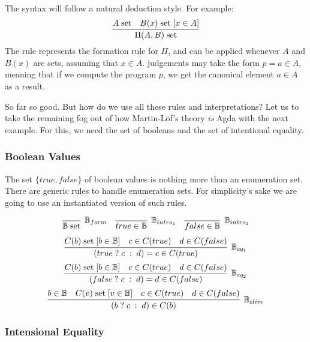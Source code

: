 \newcommand{\isset}[1]{#1 \; \text{set}}
\newcommand{\withhip}[2]{#2 \; [ #1 ] }
\newcommand{\BB}{\mathbb{B}}
\newcommand{\ite}[3]{(#1 \; ? \; #2 \; : \; #3)}
The syntax will follow a natural deduction style. For example: 
\[
  \infer{\isset{\Pi(A , B)}}{\isset{A} & \withhip{x \in A}{\isset{B(x)}}}
\]
The rule represents the formation rule for $\Pi$, and can be applied whenever $A$ and $B(x)$ are sets,
assuming that $x \in A$. judgements may take the form $p = a \in A$, meaning 
that if we compute the program $p$, we get the canonical element $a \in A$ as a result.

So far so good. But how do we use all these rules and interpretations? Let us to take the
remaining fog out of how Martin-L\"{o}f's theory \emph{is} Agda with the next example. For this,
we need the set of booleans and the set of intentional equality.

\subsubsection{Boolean Values}

The set $\{ true, false \}$ of boolean values is nothing more than an enumeration set.
There are generic rules to handle enumeration sets. For simplicity's sake we are going to use an instantiated
version of such rules.

\[ 
\begin{array}{c c c}
    \infer[\BB_{form}]{ \isset{\BB} }{} 
  & \infer[\BB_{intro_1}]{true \in \BB}{}
  & \infer[\BB_{intro_2}]{false \in \BB}{}
\end{array}
\]
\[
    \infer[\BB_{eq_1}]
          {\ite{true}{c}{d} = c \in C(true)}
          {\withhip{b \in \BB}{\isset{C(b)}}
          & c \in C(true)
          & d \in C(false)
          }
\] 
\vspace{2mm}
\[
    \infer[\BB_{eq_2}]
          {\ite{false}{c}{d} = d \in C(false)}
          {\withhip{b \in \BB}{\isset{C(b)}}
          & c \in C(true)
          & d \in C(false)
          }
\] 
\vspace{2mm}
\[
    \infer[\BB_{elim}]
          {\ite{b}{c}{d} \in C(b)}
          { b \in \BB
          & \withhip{v \in \BB}{\isset{C(v)}}
          & c \in C(true)
          & d \in C(false)
          }
\]
\vspace{2mm}

\subsubsection{Intensional Equality}

